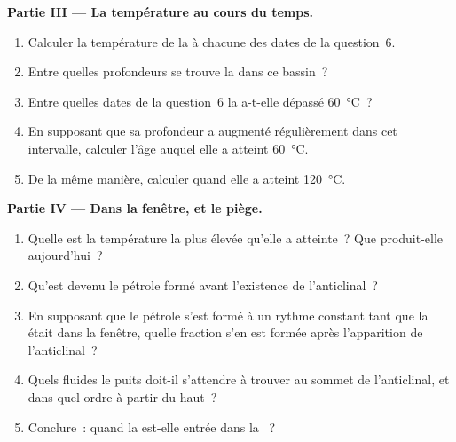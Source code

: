 \begin{problem}
\medskip
\noindent\textbf{Partie III --- La température au cours du temps.}
\begin{enumerate}[resume]
  \item Calculer la température de la  à chacune des dates de
        la question~6.
  \item Entre quelles profondeurs se trouve la  dans ce
        bassin~?
  \item Entre quelles dates de la question~6 la  a-t-elle
        dépassé \qty{60}{\degreeCelsius}~?
  \item En supposant que sa profondeur a augmenté régulièrement dans cet
        intervalle, calculer l'âge auquel elle a atteint
        \qty{60}{\degreeCelsius}.
  \item De la même manière, calculer quand elle a atteint
        \qty{120}{\degreeCelsius}.
\end{enumerate}

\medskip
\noindent\textbf{Partie IV --- Dans la fenêtre, et le piège.}
\begin{enumerate}[resume]
  \item Quelle est la température la plus élevée qu'elle a atteinte~? Que
        produit-elle aujourd'hui~?
  \item Qu'est devenu le pétrole formé avant l'existence de l'anticlinal~?
  \item En supposant que le pétrole s'est formé à un rythme constant tant
        que la  était dans la fenêtre, quelle fraction s'en est
        formée après l'apparition de l'anticlinal~?
  \item Quels fluides le puits doit-il s'attendre à trouver au sommet de
        l'anticlinal, et dans quel ordre à partir du haut~?
  \item Conclure~: quand la  est-elle entrée dans la ~?
\end{enumerate}
\end{problem}
